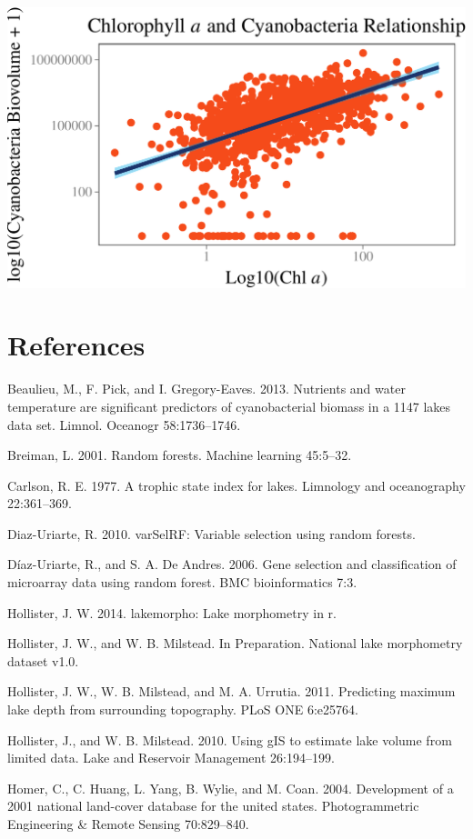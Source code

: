 \documentclass[11pt,]{article}
\begin{document}
\newpage
\includegraphics{./manuscript_files/figure-latex/scatterplot.pdf}

\newpage

\section*{References}\label{references}

Beaulieu, M., F. Pick, and I. Gregory-Eaves. 2013. Nutrients and water
temperature are significant predictors of cyanobacterial biomass in a
1147 lakes data set. Limnol. Oceanogr 58:1736--1746.

Breiman, L. 2001. Random forests. Machine learning 45:5--32.

Carlson, R. E. 1977. A trophic state index for lakes. Limnology and
oceanography 22:361--369.

Diaz-Uriarte, R. 2010. varSelRF: Variable selection using random
forests.

D{í}az-Uriarte, R., and S. A. De Andres. 2006. Gene selection and
classification of microarray data using random forest. BMC
bioinformatics 7:3.

Hollister, J. W. 2014. lakemorpho: Lake morphometry in r.

Hollister, J. W., and W. B. Milstead. In Preparation. National lake
morphometry dataset v1.0.

Hollister, J. W., W. B. Milstead, and M. A. Urrutia. 2011. Predicting
maximum lake depth from surrounding topography. PLoS ONE 6:e25764.

Hollister, J., and W. B. Milstead. 2010. Using gIS to estimate lake
volume from limited data. Lake and Reservoir Management 26:194--199.

Homer, C., C. Huang, L. Yang, B. Wylie, and M. Coan. 2004. Development
of a 2001 national land-cover database for the united states.
Photogrammetric Engineering \& Remote Sensing 70:829--840.
\end{document}
